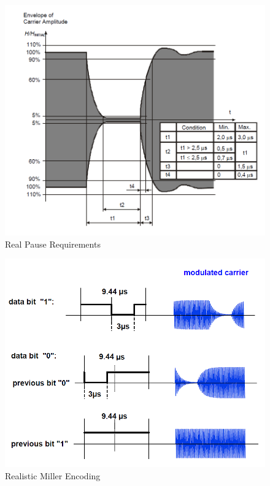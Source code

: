 \documentclass[fleqn,10pt]{SelfArx} %
\begin{document}
\begin{figure}[h]
  \includegraphics[width=\linewidth]{img/pause.png}
  \caption{Real Pause Requirements \cite{iso144432}}
  \label{fig:pause}
\end{figure}


\begin{figure}[h]
  \includegraphics[width=\linewidth]{img/miller2.png}
  \caption{Realistic Miller Encoding \cite{mifare}}
  \label{fig:miller2}
\end{figure}
\end{document}
